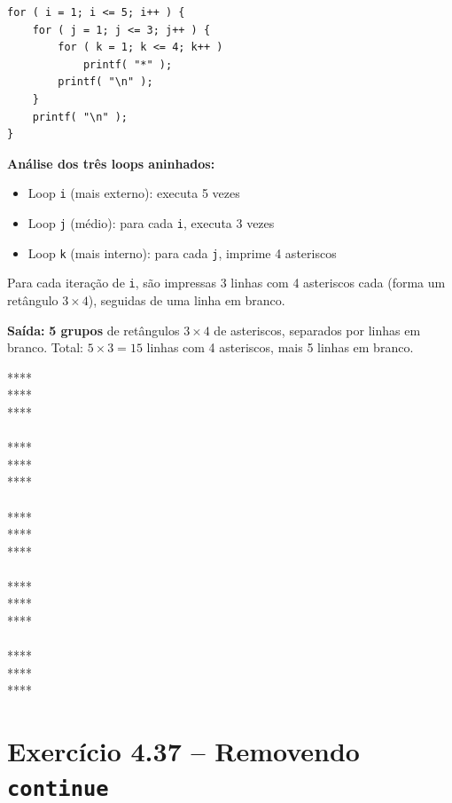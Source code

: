 \documentclass[12pt,a4paper]{article}
\begin{document}
\begin{respostabox}
\begin{lstlisting}
for ( i = 1; i <= 5; i++ ) {
    for ( j = 1; j <= 3; j++ ) {
        for ( k = 1; k <= 4; k++ )
            printf( "*" );
        printf( "\n" );
    }
    printf( "\n" );
}
\end{lstlisting}

\textbf{Análise dos três loops aninhados:}
\begin{itemize}[noitemsep]
  \item Loop \texttt{i} (mais externo): executa 5 vezes
  \item Loop \texttt{j} (médio): para cada \texttt{i}, executa 3 vezes
  \item Loop \texttt{k} (mais interno): para cada \texttt{j}, imprime 4 asteriscos
\end{itemize}

Para cada iteração de \texttt{i}, são impressas 3 linhas com 4 asteriscos cada
(forma um retângulo $3 \times 4$), seguidas de uma linha em branco.

\textbf{Saída:} \textbf{5 grupos} de retângulos $3 \times 4$ de asteriscos, separados
por linhas em branco. Total: $5 \times 3 = 15$ linhas com 4 asteriscos, mais 5 linhas
em branco.

\begin{saida}
****\\****\\****\\
\\
****\\****\\****\\
\\
****\\****\\****\\
\\
****\\****\\****\\
\\
****\\****\\****
\end{saida}
\end{respostabox}

\section{Exercício 4.37 -- Removendo \texttt{continue}}
\end{document}
